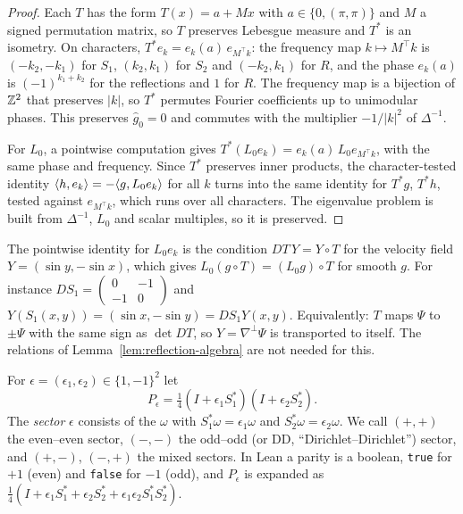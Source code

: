 \begin{proof}
\leanok
Each $T$ has the form $T(x)=a+Mx$ with $a\in\{0,(\pi,\pi)\}$ and $M$ a signed
permutation matrix, so $T$ preserves Lebesgue measure and $T^*$ is an
isometry. On characters, $T^*e_k=e_k(a)\,e_{M^\top k}$: the frequency map
$k\mapsto M^\top k$ is $(-k_2,-k_1)$ for $S_1$, $(k_2,k_1)$ for $S_2$ and
$(-k_2,k_1)$ for $R$, and the phase $e_k(a)$ is $(-1)^{k_1+k_2}$ for the
reflections and $1$ for $R$. The frequency map is a bijection of $\mathbb{Z}^2$ that
preserves $|k|$, so $T^*$ permutes Fourier coefficients up to unimodular
phases. This preserves $\hat g_0=0$ and commutes with the multiplier
$-1/|k|^2$ of $\Delta^{-1}$.

For $L_0$, a pointwise computation gives $T^*(L_0e_k)=e_k(a)\,L_0e_{M^\top k}$,
with the same phase and frequency. Since $T^*$ preserves inner products, the
character-tested identity $\langle h,e_k\rangle=-\langle g,L_0e_k\rangle$ for all $k$ turns into
the same identity for $T^*g$, $T^*h$, tested against $e_{M^\top k}$, which
runs over all characters. The eigenvalue problem is built from $\Delta^{-1}$,
$L_0$ and scalar multiples, so it is preserved.
\end{proof}

\begin{remark}
The pointwise identity for $L_0e_k$ is the condition $DT\,Y=Y\circ T$ for the
velocity field $Y=(\sin y,-\sin x)$, which gives
$L_0(g\circ T)=(L_0g)\circ T$ for smooth $g$. For instance
$DS_1=\begin{pmatrix}0&-1\\-1&0\end{pmatrix}$ and
$Y(S_1(x,y))=(\sin x,-\sin y)=DS_1Y(x,y)$. Equivalently: $T$ maps $\Psi$ to
$\pm\Psi$ with the same sign as $\det DT$, so $Y=\nabla^\perp\Psi$ is
transported to itself. The relations of Lemma~\ref{lem:reflection-algebra}
are not needed for this.
\end{remark}

\begin{definition}
\label{def:sectors}
\leanok
For $\epsilon=(\epsilon_1,\epsilon_2)\in\{1,-1\}^2$ let
\[
  P_\epsilon=\tfrac14(I+\epsilon_1S_1^*)(I+\epsilon_2S_2^*).
\]
The \emph{sector} $\epsilon$ consists of the $\omega$ with
$S_1^*\omega=\epsilon_1\omega$ and $S_2^*\omega=\epsilon_2\omega$. We call
$(+,+)$ the even--even sector, $(-,-)$ the odd--odd (or DD, ``Dirichlet--Dirichlet'')
sector, and $(+,-)$, $(-,+)$ the mixed sectors. In Lean a parity is a
boolean, \texttt{true} for $+1$ (even) and \texttt{false} for $-1$ (odd), and
$P_\epsilon$ is expanded as
$\frac14(I+\epsilon_1S_1^*+\epsilon_2S_2^*+\epsilon_1\epsilon_2S_1^*S_2^*)$.
\end{definition}

